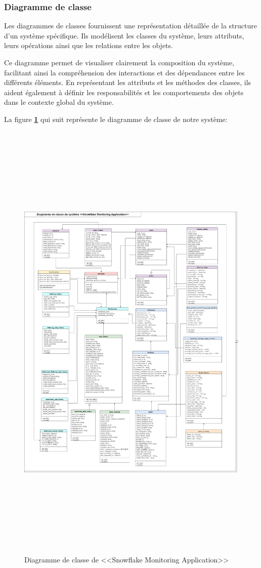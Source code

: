     \subsubsection{Diagramme de classe}
        \par Les diagrammes de classes fournissent une représentation détaillée de la structure d'un système spécifique.
        Ils modélisent les classes du système, leurs attributs, leurs opérations ainsi que les relations entre les objets\cite{diag_class}. 
        \par Ce diagramme permet de visualiser clairement la composition du système, facilitant ainsi la compréhension des interactions et des dépendances entre les différents éléments. 
        En représentant les attributs et les méthodes des classes, ils aident également à définir les responsabilités et les comportements des objets dans le contexte global du système.
        \par La figure \textbf{\ref{fig:class}} qui suit représente le diagramme de classe de notre système: 
        \begin{figure}[H]
            \centering
            \includegraphics[width =1\linewidth, height=22cm]{img/conception/class.png}
            \caption{Diagramme de classe de <<Snowflake Monitoring Application>>}
            \label{fig:class}
            \end{figure}
